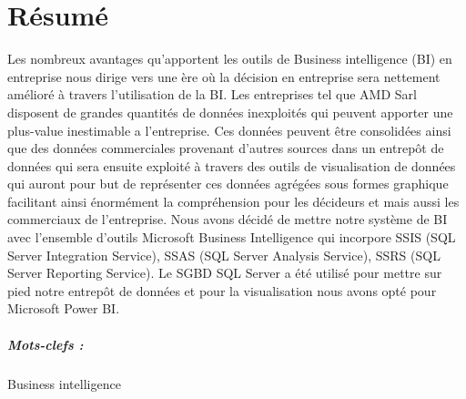 \chapter*{Résumé}%
%
Les nombreux avantages qu’apportent les outils de Business intelligence (BI) en entreprise nous dirige vers une ère où la décision en entreprise sera nettement amélioré à travers l’utilisation de la BI. Les entreprises tel que AMD Sarl disposent de grandes quantités de données inexploités qui peuvent apporter une plus-value inestimable a l’entreprise. Ces données peuvent être consolidées ainsi que des données commerciales provenant d’autres sources dans un entrepôt de données qui sera ensuite exploité à travers des outils de visualisation de données qui auront pour but de représenter ces données agrégées sous formes graphique facilitant ainsi énormément la compréhension pour les décideurs et mais aussi les commerciaux de l’entreprise. Nous avons décidé de mettre notre système de BI avec l’ensemble d’outils Microsoft Business Intelligence qui incorpore SSIS (SQL Server Integration Service), SSAS (SQL Server Analysis Service), SSRS (SQL Server Reporting Service). Le SGBD SQL Server a été utilisé pour mettre sur pied notre entrepôt de données et pour la visualisation nous avons opté pour Microsoft Power BI.

\paragraph{Mots-clefs :}Business intelligence